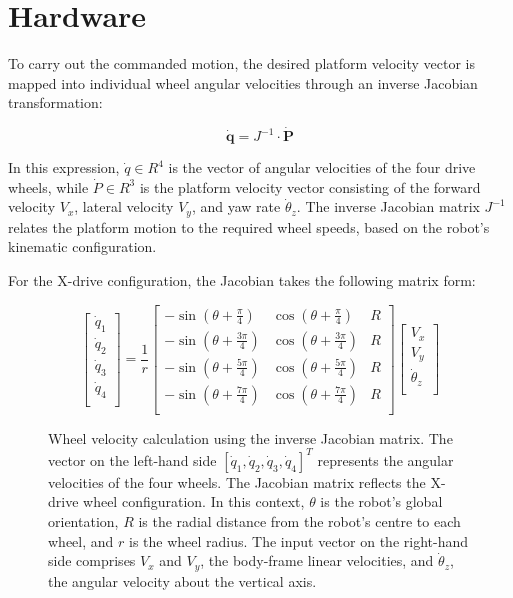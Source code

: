 \chapter{Hardware}
To carry out the commanded motion, the desired platform velocity vector is mapped into individual wheel angular velocities through an inverse Jacobian transformation:

\[
\dot{\mathbf{q}} = J^{-1} \cdot \dot{\mathbf{P}}
\]

In this expression, $\dot{q} \in R^4$ is the vector of angular velocities of the four drive wheels, while $\dot{P} \in R^3$ is the platform velocity vector consisting of the forward velocity $V_x$, lateral velocity $V_y$, and yaw rate $\dot{\theta}_z$. The inverse Jacobian matrix $J^{-1}$ relates the platform motion to the required wheel speeds, based on the robot's kinematic configuration.

For the X-drive configuration, the Jacobian takes the following matrix form:

\begin{figure}[H]
\[
\begin{bmatrix}
\dot{q}_1 \\
\dot{q}_2 \\
\dot{q}_3 \\
\dot{q}_4 \\
\end{bmatrix}
=
\frac{1}{r}
\begin{bmatrix}
-\sin(\theta + \frac{\pi}{4}) & \cos(\theta + \frac{\pi}{4}) & R \\
-\sin(\theta + \frac{3\pi}{4}) & \cos(\theta + \frac{3\pi}{4}) & R \\
-\sin(\theta + \frac{5\pi}{4}) & \cos(\theta + \frac{5\pi}{4}) & R \\
-\sin(\theta + \frac{7\pi}{4}) & \cos(\theta + \frac{7\pi}{4}) & R \\
\end{bmatrix}
\begin{bmatrix}
V_x \\ 
V_y \\
\dot{\theta}_z \\
\end{bmatrix}
\]
\caption{Wheel velocity calculation using the inverse Jacobian matrix. The vector on the left-hand side \( [\dot{q}_1, \dot{q}_2, \dot{q}_3, \dot{q}_4]^T \) represents the angular velocities of the four wheels. The Jacobian matrix reflects the X-drive wheel configuration. In this context, \( \theta \) is the robot's global orientation, \( R \) is the radial distance from the robot's centre to each wheel, and \( r \) is the wheel radius. The input vector on the right-hand side comprises \( V_x \) and \( V_y \), the body-frame linear velocities, and \( \dot{\theta}_z \), the angular velocity about the vertical axis.}
\label{fig:matrix-wheel}
\end{figure}

